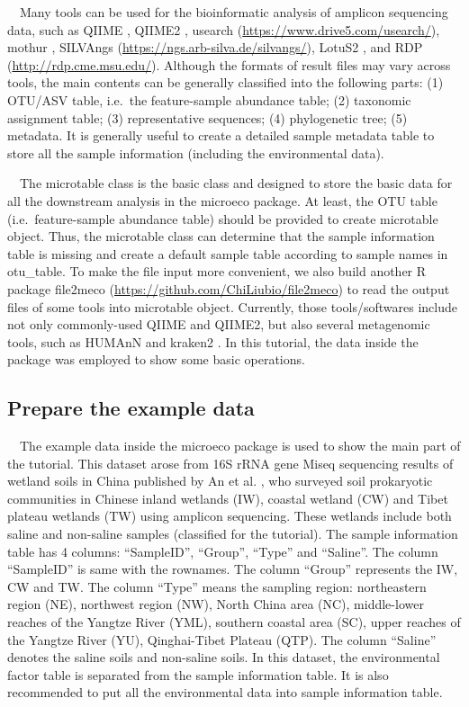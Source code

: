 \documentclass[
]{book}
\begin{document}
　Many tools can be used for the bioinformatic analysis of amplicon sequencing data, such as QIIME \citep{Caporaso_QIIME_2010}, QIIME2 \citep{Bolyen_Reproducible_2019},
usearch (\url{https://www.drive5.com/usearch/}), mothur \citep{Schloss_Introducing_2009},
SILVAngs (\url{https://ngs.arb-silva.de/silvangs/}), LotuS2 \citep{Ozkurt_LotuS2_2022},
and RDP (\url{http://rdp.cme.msu.edu/}).
Although the formats of result files may vary across tools, the main contents can be generally classified into the following parts:
(1) OTU/ASV table, i.e.~the feature-sample abundance table;
(2) taxonomic assignment table;
(3) representative sequences;
(4) phylogenetic tree;
(5) metadata.
It is generally useful to create a detailed sample metadata table to store all the sample information (including the environmental data).

　The microtable class is the basic class and designed to store the basic data for all the downstream analysis in the microeco package.
At least, the OTU table (i.e.~feature-sample abundance table) should be provided to create microtable object.
Thus, the microtable class can determine that the sample information table is missing and create a default sample table according to
sample names in otu\_table.
To make the file input more convenient,
we also build another R package file2meco (\url{https://github.com/ChiLiubio/file2meco}) to read the output files of some tools into microtable object.
Currently, those tools/softwares include not only commonly-used QIIME \citep{Caporaso_QIIME_2010} and QIIME2\citep{Bolyen_Reproducible_2019},
but also several metagenomic tools, such as HUMAnN \citep{Franzosa_Species_2018} and kraken2 \citep{Wood_Improved_2019}.
In this tutorial, the data inside the package was employed to show some basic operations.

\subsection{Prepare the example data}\label{prepare-the-example-data}

　The example data inside the microeco package is used to show the main part of the tutorial.
This dataset arose from 16S rRNA gene Miseq sequencing results of wetland soils in China published by An et al. \citep{An_Soil_2019},
who surveyed soil prokaryotic communities in Chinese inland wetlands (IW),
coastal wetland (CW) and Tibet plateau wetlands (TW) using amplicon sequencing.
These wetlands include both saline and non-saline samples (classified for the tutorial).
The sample information table has 4 columns: ``SampleID'', ``Group'', ``Type'' and ``Saline''.
The column ``SampleID'' is same with the rownames.
The column ``Group'' represents the IW, CW and TW.
The column ``Type'' means the sampling region: northeastern region (NE), northwest region (NW), North China area (NC),
middle-lower reaches of the Yangtze River (YML), southern coastal area (SC), upper reaches of the Yangtze River (YU), Qinghai-Tibet Plateau (QTP).
The column ``Saline'' denotes the saline soils and non-saline soils.
In this dataset, the environmental factor table is separated from the sample information table.
It is also recommended to put all the environmental data into sample information table.
\end{document}
